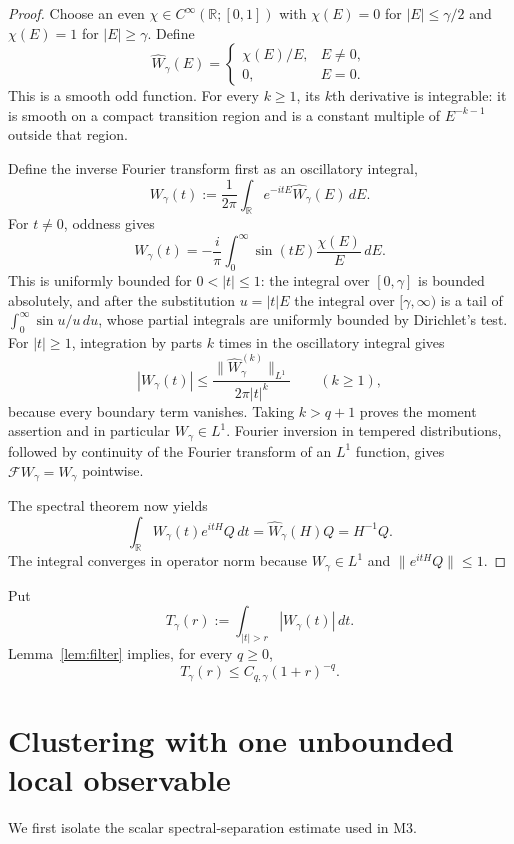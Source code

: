 \documentclass[11pt,a4paper]{article}
\theoremstyle{remark}
\newcommand{\R}{\mathbb R}
\begin{document}
\begin{proof}
Choose an even $\chi\in C^\infty(\R;[0,1])$ with
$\chi(E)=0$ for $|E|\le\gamma/2$ and $\chi(E)=1$ for $|E|\ge\gamma$.  Define
\[
 \widehat W_\gamma(E)=
 \begin{cases}\chi(E)/E,&E\ne0,\\0,&E=0.\end{cases}
\]
This is a smooth odd function.  For every $k\ge1$, its $k$th derivative is integrable: it is
smooth on a compact transition region and is a constant multiple of $E^{-k-1}$ outside that
region.

Define the inverse Fourier transform first as an oscillatory integral,
\[
 W_\gamma(t):=\frac1{2\pi}\int_\R e^{-itE}\widehat W_\gamma(E)\,dE.
\]
For $t\ne0$, oddness gives
\[
 W_\gamma(t)=-\frac{i}{\pi}\int_0^\infty
 \sin(tE)\frac{\chi(E)}E\,dE.
\]
This is uniformly bounded for $0<|t|\le1$: the integral over $[0,\gamma]$ is bounded absolutely,
and after the substitution $u=|t|E$ the integral over $[\gamma,\infty)$ is a tail of
$\int_0^\infty\sin u/u\,du$, whose partial integrals are uniformly bounded by Dirichlet's test.
For $|t|\ge1$, integration by parts $k$ times in the oscillatory integral gives
\[
 |W_\gamma(t)|\le\frac{\|\widehat W_\gamma^{(k)}\|_{L^1}}{2\pi|t|^k}
 \qquad(k\ge1),
\]
because every boundary term vanishes.  Taking $k>q+1$ proves the moment assertion and in
particular $W_\gamma\in L^1$.  Fourier inversion in tempered distributions, followed by
continuity of the Fourier transform of an $L^1$ function, gives
$\mathcal F W_\gamma=\widehat W_\gamma$ pointwise.

The spectral theorem now yields
\[
 \int_\R W_\gamma(t)e^{itH}Q\,dt
 =\widehat W_\gamma(H)Q=H^{-1}Q.
\]
The integral converges in operator norm because $W_\gamma\in L^1$ and
$\|e^{itH}Q\|\le1$.
\end{proof}

Put
\[
 T_\gamma(r):=\int_{|t|>r}|W_\gamma(t)|\,dt.
\]
Lemma~\ref{lem:filter} implies, for every $q\ge0$,
\begin{equation}\label{eq:filtertail}
 T_\gamma(r)\le C_{q,\gamma}(1+r)^{-q}.
\end{equation}

\section{Clustering with one unbounded local observable}\label{sec:cluster}

We first isolate the scalar spectral-separation estimate used in M3.
\end{document}

